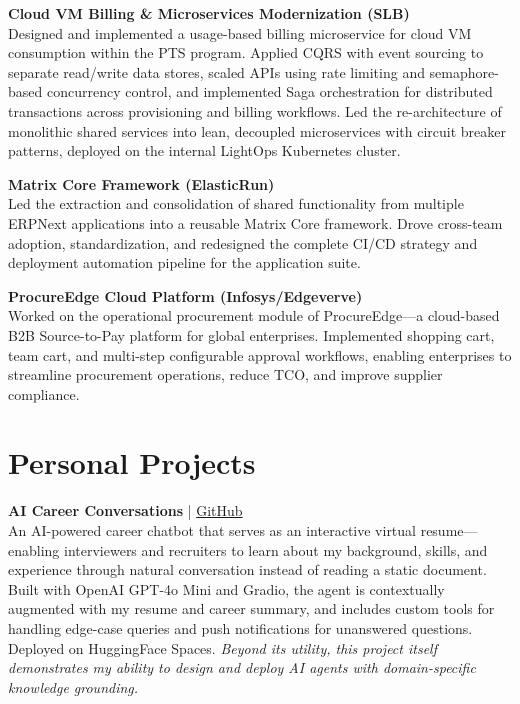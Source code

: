 \documentclass[a4paper,11pt]{article}
\begin{document}
\vspace{6pt}
\textbf{Cloud VM Billing \& Microservices Modernization (SLB)} \\
Designed and implemented a usage-based billing microservice for cloud VM consumption within the PTS program. Applied CQRS with event sourcing to separate read/write data stores, scaled APIs using rate limiting and semaphore-based concurrency control, and implemented Saga orchestration for distributed transactions across provisioning and billing workflows. Led the re-architecture of monolithic shared services into lean, decoupled microservices with circuit breaker patterns, deployed on the internal LightOps Kubernetes cluster.

\vspace{6pt}
\textbf{Matrix Core Framework (ElasticRun)} \\
Led the extraction and consolidation of shared functionality from multiple ERPNext applications into a reusable Matrix Core framework. Drove cross-team adoption, standardization, and redesigned the complete CI/CD strategy and deployment automation pipeline for the application suite.

\vspace{6pt}
\textbf{ProcureEdge Cloud Platform (Infosys/Edgeverve)} \\
Worked on the operational procurement module of ProcureEdge---a cloud-based B2B Source-to-Pay platform for global enterprises. Implemented shopping cart, team cart, and multi-step configurable approval workflows, enabling enterprises to streamline procurement operations, reduce TCO, and improve supplier compliance.

\section{Personal Projects}

\textbf{AI Career Conversations} | \href{https://github.com/Vijay2351989/ai-career-conversations}{GitHub} \\
An AI-powered career chatbot that serves as an interactive virtual resume---enabling interviewers and recruiters to learn about my background, skills, and experience through natural conversation instead of reading a static document. Built with OpenAI GPT-4o Mini and Gradio, the agent is contextually augmented with my resume and career summary, and includes custom tools for handling edge-case queries and push notifications for unanswered questions. Deployed on HuggingFace Spaces. \textit{Beyond its utility, this project itself demonstrates my ability to design and deploy AI agents with domain-specific knowledge grounding.}
\end{document}
